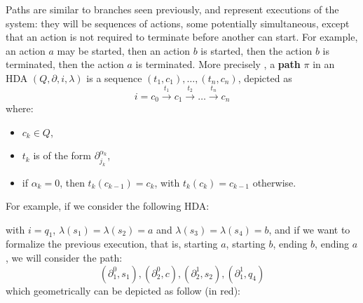 	Paths are similar to branches seen previously, and represent executions of the system: they will be sequences of actions, some potentially simultaneous, except that an action is not required to terminate before another can start. For example, an action $a$ may be started, then an action $b$ is started, then the action $b$ is terminated, then the action $a$ is terminated. More precisely \cite{vanglabbeek05}, a \textbf{path} $\pi$ in an HDA $(Q,\partial,i,\lambda)$ is a sequence $(t_1,c_1), \ldots, (t_n,c_n)$, depicted as $$i = c_0 \xrightarrow{~t_1~} c_1 \xrightarrow{~t_2~} \ldots \xrightarrow{~t_n~} c_n$$
	where:
	\begin{itemize}
		\item $c_k \in Q$,
		\item $t_k$ is of the form $\partial_{j_k}^{\alpha_k}$,
		\item if $\alpha_k = 0$, then $t_k(c_{k-1}) = c_k$, with $t_k(c_k) = c_{k-1}$ otherwise.
	\end{itemize}

	
	For example, if we consider the following HDA:
	
				\begin{figure}[H]
					\begin{center}
    						
  					\end{center}
				\end{figure}
				
\noindent with $i = q_1$, $\lambda(s_1) = \lambda(s_2) = a$ and $\lambda(s_3) = \lambda(s_4) = b$, and if we want to formalize the previous execution, that is, starting $a$, starting $b$, ending $b$, ending $a$, we will consider the path:
	$$(\partial_1^0,s_1), (\partial_2^0, c), (\partial_2^1,s_2), (\partial_1^1,q_4)$$
	which geometrically can be depicted as follow (in red):
	
				\begin{figure}[H]
					\begin{center}
    						
  					\end{center}
				\end{figure}

